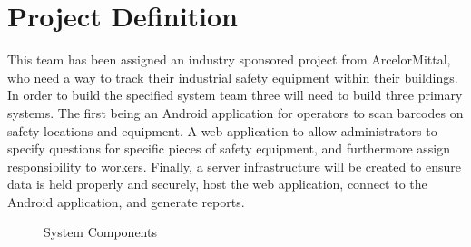 \documentclass[Letter,11pt]{article}
\begin{document}
\section{Project Definition}\label{def}
	This team has been assigned an industry sponsored project from ArcelorMittal, who need a way to track their industrial safety equipment within their buildings. In order to build the specified system team three will need to build three primary systems. The first being an Android application for operators to scan barcodes on safety locations and equipment. A web application to allow administrators to specify questions for specific pieces of safety equipment, and furthermore assign responsibility to workers. Finally, a server infrastructure will be created to ensure data is held properly and securely, host the web application, connect to the Android application, and generate reports. 
			
	\begin{figure}[h]
		\centering
		
		\caption{\label{sysConn} System Components}
	\end{figure}
	
\end{document}
